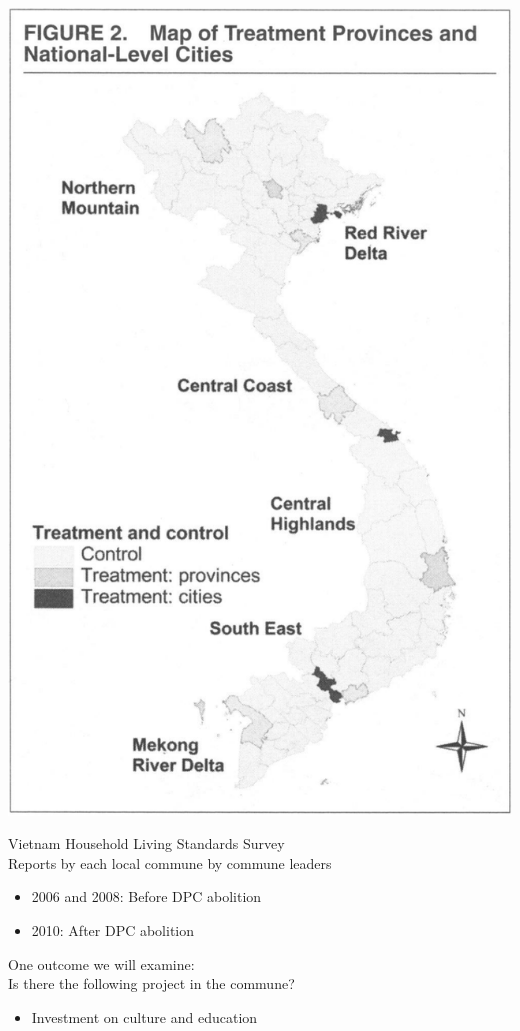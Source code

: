 \documentclass{beamer}
\begin{document}
\begin{frame}
\centering
\includegraphics[height = .9\textheight]{figures/malesky_map}
\end{frame}

\begin{frame}

Vietnam Household Living Standards Survey\\
Reports by each local commune by commune leaders
\begin{itemize}
\item 2006 and 2008: Before DPC abolition
\item 2010: After DPC abolition
\end{itemize}
One outcome we will examine:\\
Is there the following project in the commune?
\begin{itemize}
\item Investment on culture and education
\end{itemize}

\end{frame}
\end{document}
